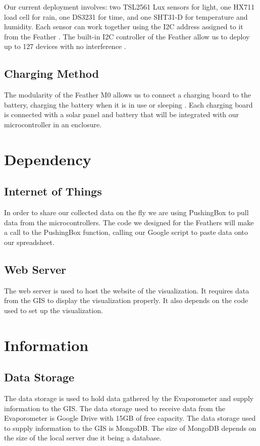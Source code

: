 \documentclass[onecolumn, draftclsnofoot,10pt, compsoc]{IEEEtran}
\begin{document}
Our current deployment involves: two TSL2561 Lux sensors for light, one HX711 load cell for rain, one DS3231 for time, and one SHT31-D for temperature and humidity.  Each sensor can work together using the I2C address assigned to it from the Feather \cite{t1}.  The built-in I2C controller of the Feather allow us to deploy up to 127 devices with no interference \cite{t1}.


\subsection{Charging Method}
The modularity of the Feather M0 allows us to connect a charging board to the battery, charging the battery when it is in use or sleeping \cite{t2}.  Each charging board is connected with a solar panel and battery that will be integrated with our microcontroller in an enclosure.



\section{Dependency}
\subsection{Internet of Things}
In order to share our collected data on the fly we are using PushingBox to pull data from the microcontrollers.  The code we designed for the Feathers will make a call to the PushingBox function, calling our Google script to paste data onto our spreadsheet.  

\subsection{Web Server}
The web server is used to host the website of the visualization. It requires data from the GIS to display the visualization properly. It also depends on the code used to set up the visualization. 

\section{Information}
\subsection{Data Storage}
The data storage is used to hold data gathered by the Evaporometer and supply information to the GIS. The data storage used to receive data from the Evaporometer is Google Drive with 15GB of free capacity\cite{t6}. The data storage used to supply information to the GIS is MongoDB. The size of MongoDB depends on the size of the local server due it being a database.
\end{document}
